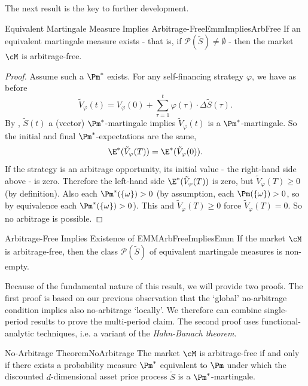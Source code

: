 The next result is the key to further development.

\begin{prop}{Equivalent Martingale Measure Implies Arbitrage-Free}{EmmImpliesArbFree}
	If an equivalent martingale measure exists - that is, if $\mathcal{P}(\tilde{S}) \neq \emptyset$ - then the market $\cM$ is arbitrage-free.
\end{prop}

\begin{proof}
	Assume such a $\Pm^*$ exists. For any self-financing strategy $\varphi$, we have as before
	\[
		\tilde{V}_{\varphi}(t) = V_{\varphi}(0) + \sum_{\tau=1}^t \varphi(\tau) \cdot \Delta\tilde{S}(\tau).
	\]
	By , $\tilde{S}(t)$ a (vector) $\Pm^*$-martingale implies $\tilde{V}_{\varphi}(t)$ is a $\Pm^*$-martingale. So the initial and final $\Pm^*$-expectations are the same,
	\[
		\E^*(\tilde{V}_{\varphi}(T)) = \E^*(\tilde{V}_{\varphi}(0)).
	\]
	If the strategy is an arbitrage opportunity, its initial value - the right-hand side above - is zero. Therefore the left-hand side $\E^*(\tilde{V}_{\varphi}(T))$ is zero, but $\tilde{V}_{\varphi}(T) \geq 0$ (by definition). Also each $\Pm^*(\{ \omega \}) > 0$ (by assumption, each $\Pm(\{ \omega \}) > 0$, so by equivalence each $\Pm^*(\{ \omega \}) > 0$). This and $\tilde{V}_{\varphi}(T) \geq 0$ force $\tilde{V}_{\varphi}(T) = 0$. So no arbitrage is possible.
\end{proof}

\begin{prop}{Arbitrage-Free Implies Existence of EMM}{ArbFreeImpliesEmm}
	If the market $\cM$ is arbitrage-free, then the class $\mathcal{P}(\tilde{S})$ of equivalent martingale measures is non-empty.
\end{prop}

Because of the fundamental nature of this result, we will provide two proofs. The first proof is based on our previous observation that the `global' no-arbitrage condition implies also no-arbitrage `locally'. We therefore can combine single-period results to prove the multi-period claim. The second proof uses functional-analytic techniques, i.e. a variant of the \textit{Hahn-Banach theorem}.

\begin{thm}{No-Arbitrage Theorem}{NoArbitrage}
	The market $\cM$ is arbitrage-free if and only if there exists a probability measure $\Pm^*$ equivalent to $\Pm$ under which the discounted $d$-dimensional asset price process $\tilde{S}$ is a $\Pm^*$-martingale.
\end{thm}

